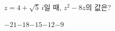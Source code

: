 $z=4+\sqrt{5}\,i$일 때, $z^2-8z$의 값은?
\begin{choices32}{$-21$}{$-18$}{$-15$}{$-12$}{$-9$}\end{choices32}
